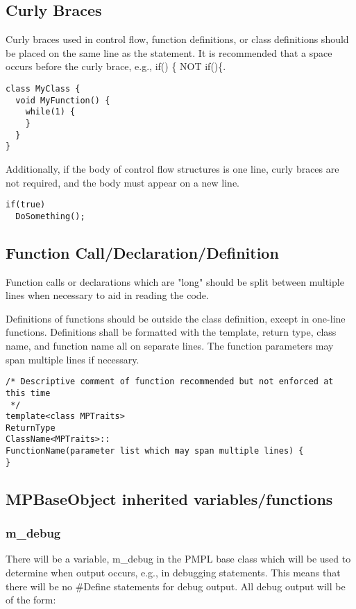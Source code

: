 \documentclass[12pt]{article}
\begin{document}
\subsection{Curly Braces}
Curly braces used in control flow, function definitions, or class definitions
should be placed on the same line as the statement. It is recommended that a
space occurs before the curly brace, e.g., if() \{ NOT if()\{.

\begin{lstlisting}
class MyClass {
  void MyFunction() {
    while(1) {
    }
  }
}
\end{lstlisting}

Additionally, if the body of control flow structures is one line, curly braces
are not required, and the body must appear on a new line.

\begin{lstlisting}
if(true)
  DoSomething();
\end{lstlisting}

\subsection{Function Call/Declaration/Definition}
Function calls or declarations which are "long" should be split between multiple
lines when necessary to aid in reading the code.

Definitions of functions should be outside the class definition, except in one-line
functions. Definitions shall be formatted with the template, return type, class
name, and function name all on separate lines. The function parameters may span
multiple lines if necessary.

\begin{lstlisting}
/* Descriptive comment of function recommended but not enforced at this time
 */
template<class MPTraits>
ReturnType
ClassName<MPTraits>::
FunctionName(parameter list which may span multiple lines) {
}
\end{lstlisting}

\subsection{MPBaseObject inherited variables/functions}

\subsubsection{m\_debug}

There will be a variable, m\_debug in the PMPL base class which will be used to
determine when output occurs, e.g., in debugging statements. This means that
there will be no \#Define statements for debug output. All debug output will be
of the form:
\end{document}
